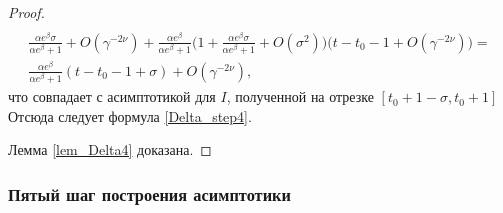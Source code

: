 \begin{proof}
\begin{multline}
	\\
	\frac{\alpha e^\beta\sigma}{\alpha e^\beta+1}+O(\gamma^{-2\nu})+
	\frac{\alpha e^\beta}{\alpha e^{\beta}+1}\Big(1+\frac{\alpha e^{\beta}\sigma}{\alpha e^\beta+1}+O(\sigma^2)\Big)\big(
	t-t_0-1+O(\gamma^{-2\nu})\big)=
	\\
	\frac{\alpha e^\beta}{\alpha e^{\beta}+1}(
	t-t_0-1+\sigma)+O(\gamma^{-2\nu}),
\end{multline}
\normalsize
что совпадает с асимптотикой для $I$, полученной на отрезке $[t_0+1-\sigma,t_0+1]$
Отсюда следует формула \eqref{Delta_step4}. 

Лемма \ref{lem_Delta4} доказана.

\end{proof}



\subsubsection{Пятый шаг построения асимптотики}

